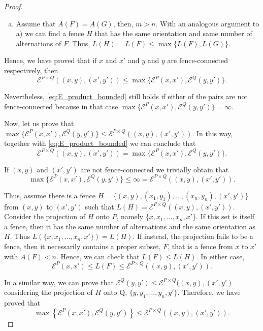 \documentclass{article}[12pt]
\theoremstyle{exampstyle}
\theoremstyle{remark}
\newcommand{\E}{\mathcal{E}}
\newcommand{\tuple}[3][1]{#2_{#1}, \dots , #2_{#3}}
\begin{document}
\begin{proof}
\begin{enumerate}[a)]
        In this way, $H$ is an upward fence with $m+1$ alternations. When $m$ is even we obtain $L(H) = \frac{(m + 1)+ 1}{2} = L(F) = L(G)$. If instead $m$ is odd, then \mbox{$L(H) = \frac{(m + 1)+ 2}{2} = L(\cdot)$} where "$\cdot$" denotes whichever of $F$ and $G$ is the downward fence. Thus, \mbox{ $ L(H) \leq \max\{L(F),L(G)\}$}
        
        \item Assume that  $A(F) = A(G)$, then, $m > n$. With an analogous argument to a) we can find a fence $H$ that has the same orientation and same number of alternations of $F$. Thus, \mbox{$L(H) = L(F) \leq \max\{L(F),L(G)\}$.}
    \end{enumerate}

    Hence, we have proved that if $x$ and $x'$ and $y$ and $y$ are fence-connected respectively, then \begin{equation}
        \E^{P \times Q}((x,y), (x',y')) \leq  \max\{ \E^P(x,x') , \E^Q(y,y')\}.
        \label{eq:E_product_bounded}
    \end{equation}

    Nevertheless, \eqref{eq:E_product_bounded} still holds if either of the pairs are not fence-connected because in that case $\max\{ \E^P(x,x') , \E^Q(y,y')\} = \infty$.

    Now, let us prove that $\max\{ \E^P(x,x') , \E^Q(y,y')\} \leq \E^{P \times Q}((x,y), (x',y'))$. In this way, together with \eqref{eq:E_product_bounded} we can conclude that 
    \begin{equation*}
        \E^{P \times Q}((x,y), (x',y')) =  \max\{ \E^P(x,x') , \E^Q(y,y')\}.
    \end{equation*}

    If $(x,y)$ and $ (x',y')$ are not fence-connected we trivially obtain that 
    \[\max\{ \E^P(x,x') , \E^Q(y,y')\} \leq \infty = \E^{P \times Q}((x,y), (x',y')) .\] 
    
    Thus, assume there is a fence $H = \{ (x,y), (x_1,y_1), \ldots, (x_n,y_n), (x',y')\} $ from $(x,y)$ to $(x',y')$ such that \mbox{$L(H) = \E^{P \times Q}((x,y), (x',y'))$}. Consider the projection of $H$ onto $P$, namely $ \{x,\tuple{x}{n},x'\}$. If this set is itself a fence, then it has the same number of alternations and the same orientation as $H$. Thus $L(\{x,\tuple{x}{n},x'\}) = L(H)$. If instead, the projection fails to be a fence, then it necessarily contains a proper subset, $F$, that is a fence from $x$ to $x'$ with $A(F) < n$. Hence, we can check that $L(F) \leq L(H)$. In either case, 
    \[
        \E^P(x,x') \leq L(F) \leq \E^{P \times Q}((x,y), (x',y')).
    \]

    In a similar way, we can prove that $\E^Q(y,y') \leq \E^{P \times Q}((x,y), (x',y')$ considering the projection of $H$ onto Q, $\{y,\tuple{y}{n},y'\}$. Therefore, we have proved that
    \begin{equation*}
            \max\left\{ \E^P(x,x') , \E^Q(y,y') \right\} \leq \E^{P \times Q}((x,y), (x',y')).
    \end{equation*} 
\end{proof}
\end{document}

